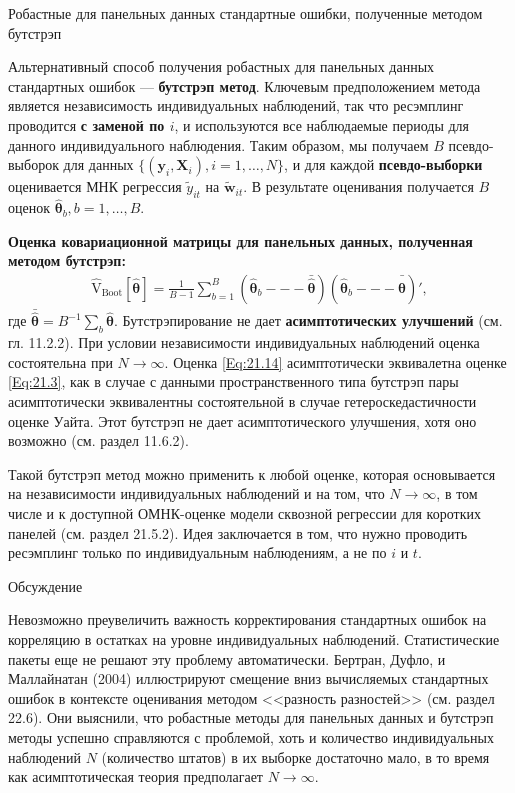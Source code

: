 {\centering
Робастные для панельных данных стандартные ошибки, полученные методом бутстрэп \\}

Альтернативный способ получения робастных для панельных данных стандартных ошибок --- \textbf{бутстрэп метод}. Ключевым предположением метода является независимость индивидуальных наблюдений, так что ресэмплинг проводится \textbf{с заменой по $i$}, и используются все наблюдаемые периоды для данного индивидуального наблюдения.
Таким образом, мы получаем $B$ псевдо-выборок для данных $\{(\mathbf y_i, \mathbf X_i), i = 1, \dots, N\}$, и для каждой \textbf{псевдо-выборки} оценивается МНК регрессия $\tilde{y}_{it}$ на $\tilde{\mathbf w}_{it}$. В результате оценивания получается $B$ оценок $\hat{\bm \theta}_b, b=1, \dots, B$.

\textbf{Оценка ковариационной матрицы для панельных данных, полученная методом бутстрэп:}
\begin{align}
\hat{\mathrm V}_{\mathrm {Boot}}[\hat{\bm\theta}]=\frac{1}{B-1} \sum_{b=1}^B \left(\hat{\bm\theta}_b --- \bar{\hat{\bm\theta}} \right) \left( \hat{\bm\theta}_b --- \bar{\hat{\bm\theta}} \right)',
\label{Eq:21.14}
\end{align}
где $\bar{\bm{\hat{\theta}}}=B^{-1} \sum\nolimits_b \bm{\hat{\theta}}$. Бутстрэпирование не дает \textbf{асимптотических улучшений} (см. гл. 11.2.2). При условии независимости индивидуальных наблюдений оценка состоятельна при $N \rightarrow \infty$. Оценка \ref{Eq:21.14} асимптотически эквивалетна оценке \ref{Eq:21.3}, как в случае с данными пространственного типа бутстрэп пары асимптотически эквивалентны состоятельной в случае гетероскедастичности оценке Уайта. Этот бутстрэп не дает асимптотического улучшения, хотя оно возможно (см. раздел 11.6.2).

Такой бутстрэп метод  можно применить к любой оценке, которая основывается на независимости индивидуальных наблюдений и на том, что $N \rightarrow \infty$, в том числе и к доступной ОМНК-оценке модели сквозной регрессии для коротких панелей (см. раздел 21.5.2). Идея заключается в том, что нужно проводить ресэмплинг только по индивидуальным наблюдениям, а не по $i$ и $t$.

 
{\centering
Обсуждение\\}

Невозможно преувеличить важность корректирования стандартных ошибок на корреляцию в остатках на уровне индивидуальных наблюдений. Статистические пакеты еще не решают эту проблему автоматически. Бертран, Дуфло, и Маллайнатан (2004) иллюстрируют смещение вниз вычисляемых стандартных ошибок в контексте оценивания методом <<разность разностей>> (см. раздел 22.6). Они выяснили, что робастные методы для панельных данных и бутстрэп методы успешно справляются с проблемой, хоть и количество индивидуальных наблюдений $N$ (количество штатов) в их выборке достаточно мало, в то время как асимптотическая теория предполагает $N \rightarrow \infty$.

